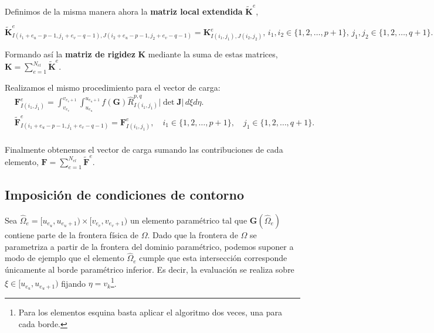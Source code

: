 \documentclass[11pt]{book}
\theoremstyle{plain} %
\theoremstyle{definition} %
\theoremstyle{definition} %
\begin{document}
Definimos de la misma manera ahora la \textbf{matriz local extendida} $\widetilde{\mathbf{K}}^e$,

\vspace{-0.35cm}

\begin{equation*}
    \widetilde{\mathbf{K}}^e_{I(i_1+e_u-p-1,j_1+e_v-q-1),J(i_2+e_u-p-1, j_2+e_v-q-1)}=\mathbf{K}^e_{I(i_1,j_1),J(i_2,j_2)},\, i_1, i_2 \in \{1,2,\dots,p+1\}, \, j_1, j_2 \in \{1,2,\dots,q+1\}.
\end{equation*}

\vspace{-0.05cm}

Formando así la \textbf{matriz de rigidez} $\mathbf{K}$ mediante la suma de estas matrices, $\mathbf{K} = \sum_{e=1}^{N_{el}} \widetilde{\mathbf{K}}^e$.


Realizamos el mismo procedimiento para el vector de carga:
{\setlength{\abovedisplayskip}{2pt}
\setlength{\belowdisplayskip}{2pt}
\begin{align*}
    &\mathbf{F}^e_{I(i_1,j_1)}=\int_{v_{e_v}}^{v_{{e_v}+1}}\int_{u_{e_u}}^{u_{{e_u}+1}}f(\mathbf{G})\hat{R}_{I(i_1,j_1)}^{p,q}|\det \mathbf{J}| \, d\xi d\eta. \\
    &\widetilde{\mathbf{F}}^e_{I(i_1+e_u-p-1,j_1+e_v-q-1)}=\mathbf{F}^e_{I(i_1,j_1)}, \quad i_1 \in \{1,2,\dots,p+1\}, \quad j_1 \in \{1,2,\dots,q+1\}.\\
\end{align*}
}

\vspace{-0.4cm}

Finalmente obtenemos el vector de carga sumando las contribuciones de cada elemento, $\mathbf{F}= \sum_{e=1}^{N_{el}} \widetilde{\mathbf{F}}^e$.
\vspace{-0.6cm}

\subsection{Imposición de condiciones de contorno}

\vspace{-0.1cm}

\label{sec:cond2D}

Sea $\hat{\Omega}_e = [u_{e_u}, u_{e_u+1}) \times [v_{e_v}, v_{e_v+1})$ un elemento paramétrico tal que $\mathbf{G}(\hat{\Omega}_e)$ contiene parte de la frontera física de $\Omega$. Dado que la frontera de $\Omega$ se parametriza a partir de la frontera del dominio paramétrico, podemos suponer a modo de ejemplo que el elemento $\hat{\Omega}_e$ cumple que esta intersección corresponde únicamente al borde paramétrico inferior. Es decir, la evaluación se realiza sobre $\xi \in [u_{e_u}, u_{e_u+1})$ fijando $\eta = v_k$\footnote{Para los elementos esquina basta aplicar el algoritmo dos veces, una para cada borde.}.
\end{document}
